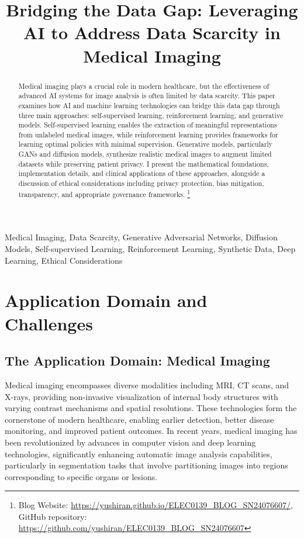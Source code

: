 \documentclass{article}
\title{Bridging the Data Gap: Leveraging AI to Address Data Scarcity in Medical Imaging}
\begin{document}
%
\maketitle
%
\begin{abstract}
Medical imaging plays a crucial role in modern healthcare, but the effectiveness of advanced AI systems for image analysis is often limited by data scarcity. This paper examines how AI and machine learning technologies can bridge this data gap through three main approaches: self-supervised learning, reinforcement learning, and generative models. 
Self-supervised learning enables the extraction of meaningful representations from unlabeled medical images, while reinforcement learning provides frameworks for learning optimal policies with minimal supervision. Generative models, particularly GANs and diffusion models, synthesize realistic medical images to augment limited datasets while preserving patient privacy. 
I present the mathematical foundations, implementation details, and clinical applications of these approaches, alongside a discussion of ethical considerations including privacy protection, bias mitigation, transparency, and appropriate governance frameworks. 
\footnote{Blog Website: \url{https://yushiran.github.io/ELEC0139_BLOG_SN24076607/}, GitHub repository: \url{https://github.com/yushiran/ELEC0139_BLOG_SN24076607}}
\end{abstract}
%
\begin{keywords}
Medical Imaging, Data Scarcity, Generative Adversarial Networks, Diffusion Models, Self-supervised Learning, Reinforcement Learning, Synthetic Data, Deep Learning, Ethical Considerations
\end{keywords}
%

\section{Application Domain and Challenges}
\label{sec:app_domain}

\subsection{The Application Domain: Medical Imaging}
Medical imaging encompasses diverse modalities including MRI, CT scans, and X-rays, providing non-invasive visualization of internal body structures with varying contrast mechanisms and spatial resolutions. These technologies form the cornerstone of modern healthcare, enabling earlier detection, better disease monitoring, and improved patient outcomes. In recent years, medical imaging has been revolutionized by advances in computer vision and deep learning technologies\cite{upadhyayAdvancesDeepLearning2024}, significantly enhancing automatic image analysis capabilities, particularly in segmentation tasks that involve partitioning images into regions corresponding to specific organs or lesions\cite{sushankiReviewComputationalMethods2024}.
\end{document}
